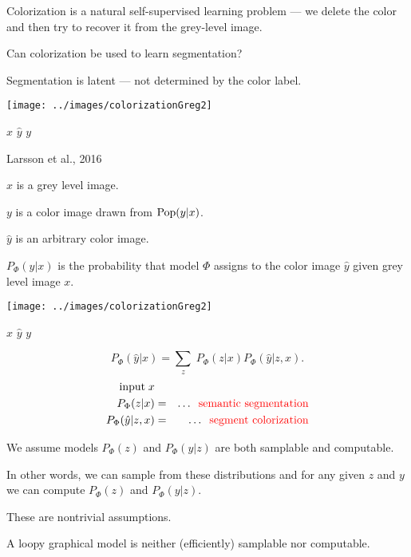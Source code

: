 {\vfill
Colorization is a natural self-supervised learning problem --- we delete the color and then try to recover it from the grey-level image.

\vfill
Can colorization be used to learn segmentation?

\vfill
Segmentation is latent --- not determined by the color label.

\medskip
\centerline{\texttt{[image: ../images/colorizationGreg2]}}
\centerline{$x$ \hspace{4em} $\hat{y}$ \hspace{4em} $y$}
\centerline{\huge Larsson et al., 2016}

\vfill
$x$ is a grey level image.

\vfill
$y$ is a color image drawn from $\mathrm{Pop}(y|x)$.

\vfill
$\hat{y}$ is an arbitrary color image.

\vfill
$P_\Phi(\hat{y}|x)$ is the probability that model $\Phi$ assigns to the color image $\hat{y}$ given grey level image $x$.

\medskip
\centerline{\texttt{[image: ../images/colorizationGreg2]}}
\centerline{$x$ \hspace{4em} $\hat{y}$ \hspace{4em} $y$}

\vfill
{\color{red} $$P_\Phi(\hat{y}|x) = \sum_z\;P_\Phi(z|x)P_\Phi(\hat{y}|z,x).$$}
\begin{eqnarray*}
\mbox{input}\; x \\
P_\Phi(z|x) & = & \ldots \;\;\mbox{\color{red} semantic segmentation} \\
P_\Phi(\hat{y}|z,x) & = & \ldots \;\;\mbox{\color{red} segment colorization} \\
\end{eqnarray*}


\bigskip
\bigskip
We assume models $P_\Phi(z)$ and $P_\Phi(y|z)$ are both samplable and computable.

\vfill
In other words, we can sample from these distributions and for any given $z$ and $y$ we can compute $P_\Phi(z)$ and $P_\Phi(y|z)$.

\vfill
These are nontrivial assumptions.

\vfill
A loopy graphical model is neither (efficiently) samplable nor computable.


}
